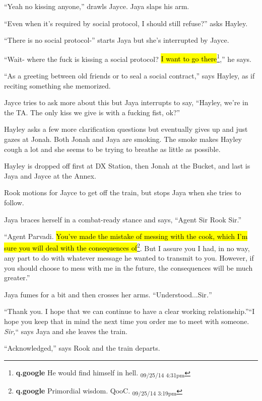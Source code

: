 ``Yeah no kissing anyone,'' drawls Jayce.  Jaya slaps his arm.

``Even when it's required by social protocol, I should still refuse?'' asks Hayley.

``There is no social protocol-'' starts Jaya but she's interrupted by Jayce.  

``Wait- where the fuck is kissing a social protocol?  \hl{I want to go there}\footnote{\textbf{q.google }He would find himself in hell. \textsubscript{09/25/14 4:31pm}},'' he says.

``As a greeting between old friends or to seal a social contract,'' says Hayley, as if reciting something she memorized.

Jayce tries to ask more about this but Jaya interrupts to say, ``Hayley, we're in the TA. The only kiss we give is with a fucking fist, ok?''

Hayley asks a few more clarification questions but eventually gives up and just gazes at Jonah.  Both Jonah and Jaya are smoking.  The smoke makes Hayley cough a lot and she seems to be trying to breathe as little as possible.



Hayley is dropped off first at DX Station, then Jonah at the Bucket, and last is Jaya and Jayce at the Annex.





Rook motions for Jayce to get off the train, but stops Jaya when she tries to follow.  

Jaya braces herself in a combat-ready stance and says, ``Agent Sir Rook Sir.''

``Agent Parvadi.  \hl{You've made the mistake of messing with the cook, which I'm sure you will deal with the consequences of}\footnote{\textbf{q.google }Primordial wisdom.
QooC. \textsubscript{09/25/14 3:19pm}}.  But I assure you I had, in no way, any part to do with whatever message he wanted to transmit to you.  However, if you should choose to mess with me in the future, the consequences will be much greater.''

Jaya fumes for a bit and then crosses her arms.  ``Understood...Sir\textit{.}''

``Thank you.  I hope that we can continue to have a clear working relationship.''``I hope you keep that in mind the next time you order me to meet with someone.  \textit{Sir,}`` says Jaya and she leaves the train.

``Acknowledged,'' says Rook and the train departs.




